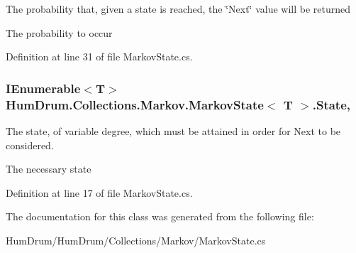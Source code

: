 The probability that, given a state is reached, the \char`\"{}\+Next\char`\"{} value will be returned 

The probability to occur

Definition at line 31 of file Markov\+State.\+cs.

\hypertarget{classHumDrum_1_1Collections_1_1Markov_1_1MarkovState_a6af42036b04d84e26d06ee5d86790094}{}
\subsubsection[{State}]{\setlength{\rightskip}{0pt plus 5cm}I\+Enumerable$<$T$>$ {\bf Hum\+Drum.\+Collections.\+Markov.\+Markov\+State}$<$ T $>$.State\hspace{0.3cm}{\ttfamily [get]}, {\ttfamily [set]}}\label{classHumDrum_1_1Collections_1_1Markov_1_1MarkovState_a6af42036b04d84e26d06ee5d86790094}


The state, of variable degree, which must be attained in order for Next to be considered. 

The necessary state

Definition at line 17 of file Markov\+State.\+cs.



The documentation for this class was generated from the following file\+:\begin{DoxyCompactItemize}
\item 
Hum\+Drum/\+Hum\+Drum/\+Collections/\+Markov/Markov\+State.\+cs\end{DoxyCompactItemize}
